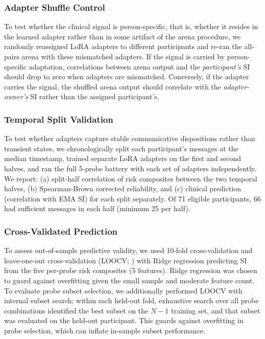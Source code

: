 \documentclass[review,12pt,authoryear]{elsarticle}
\begin{document}
\subsubsection{Adapter Shuffle Control}

To test whether the clinical signal is person-specific, that is, whether it resides in the learned adapter rather than in some artifact of the arena procedure, we randomly reassigned LoRA adapters to different participants and re-ran the all-pairs arena with these mismatched adapters. If the signal is carried by person-specific adaptation, correlations between arena output and the \textit{participant's} SI should drop to zero when adapters are mismatched. Conversely, if the adapter carries the signal, the shuffled arena output should correlate with the \textit{adapter-owner's} SI rather than the assigned participant's.

\subsubsection{Temporal Split Validation}

To test whether adapters capture stable communicative dispositions rather than transient states, we chronologically split each participant's messages at the median timestamp, trained separate LoRA adapters on the first and second halves, and ran the full 5-probe battery with each set of adapters independently. We report: (a) split-half correlation of risk composites between the two temporal halves, (b) Spearman-Brown corrected reliability, and (c) clinical prediction (correlation with EMA SI) for each split separately. Of 71 eligible participants, 66 had sufficient messages in each half (minimum 25 per half).

\subsubsection{Cross-Validated Prediction}

To assess out-of-sample predictive validity, we used 10-fold cross-validation and leave-one-out cross-validation (LOOCV; \citealt{stone1974cross}) with Ridge regression \citep{hoerl1970ridge} predicting SI from the five per-probe risk composites (5 features). Ridge regression was chosen to guard against overfitting given the small sample and moderate feature count. To evaluate probe subset selection, we additionally performed LOOCV with internal subset search: within each held-out fold, exhaustive search over all probe combinations identified the best subset on the $N-1$ training set, and that subset was evaluated on the held-out participant. This guards against overfitting in probe selection, which can inflate in-sample subset performance.
\end{document}
